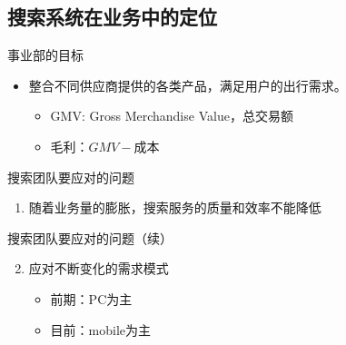 \documentclass{beamer}
\begin{document}
\begin{CJK}{UTF8}{gbsn}
\section{搜索系统在业务中的定位}


\begin{frame}{事业部的目标}
  \begin{itemize}
  \item { 整合不同供应商提供的各类产品，满足用户的出行需求。
    \begin{itemize}
      \item<2-> { GMV: Gross Merchandise Value，总交易额 }
      \item<2-> { 毛利：$GMV - \text{成本} $ }
    \end{itemize}
  }
  \end{itemize}
\end{frame}

\begin{frame}{搜索团队要应对的问题}
  \begin{enumerate}
    \item { 随着业务量的膨胀，搜索服务的质量和效率不能降低 }
  \end{enumerate}
   {
    \begin{center}
      \begin{scaletikzpicturetowidth}{\textwidth}
      \end{scaletikzpicturetowidth}
    \end{center}
  }
\end{frame}

\begin{frame}{搜索团队要应对的问题（续）}
  \begin{enumerate}\setcounter{enumi}{1}
  \item {
    应对不断变化的需求模式
    \begin{itemize}
      \item { 前期：PC为主 }
      \item { 目前：mobile为主 }
    \end{itemize}
  }
  \end{enumerate}
\end{frame}


\end{CJK}
\end{document}
